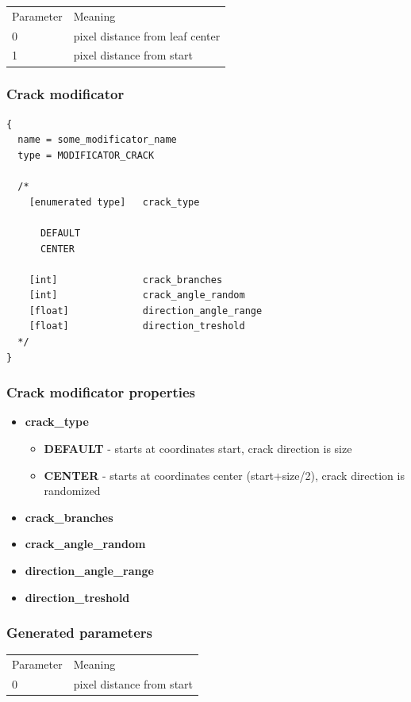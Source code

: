 \documentclass[9pt]{article}
\begin{document}
\begin{tabular}{|l||l|}
  Parameter & Meaning \\
  0 & pixel distance from leaf center \\
  1 & pixel distance from start \\  
\end{tabular}

\subsubsection{Crack modificator}

\begin{verbatim}
{
  name = some_modificator_name
  type = MODIFICATOR_CRACK

  /*
    [enumerated type]   crack_type
    
      DEFAULT
      CENTER

    [int]               crack_branches
    [int]               crack_angle_random
    [float]             direction_angle_range
    [float]             direction_treshold
  */
}
\end{verbatim}
\subsubsection*{Crack modificator properties}
\begin{itemize}
\item{\bf crack\_type}
\begin{itemize}
\item{\bf DEFAULT} - starts at coordinates start, crack direction is size
\item{\bf CENTER} - starts at coordinates center (start+size/2), 
crack direction is randomized
\end{itemize}
\item{\bf crack\_branches}
\item{\bf crack\_angle\_random}
\item{\bf direction\_angle\_range}
\item{\bf direction\_treshold}
\end{itemize}

\subsubsection*{Generated parameters}

\begin{tabular}{|l||l|}
  Parameter & Meaning \\
  0 & pixel distance from start \\
\end{tabular}
\end{document}
